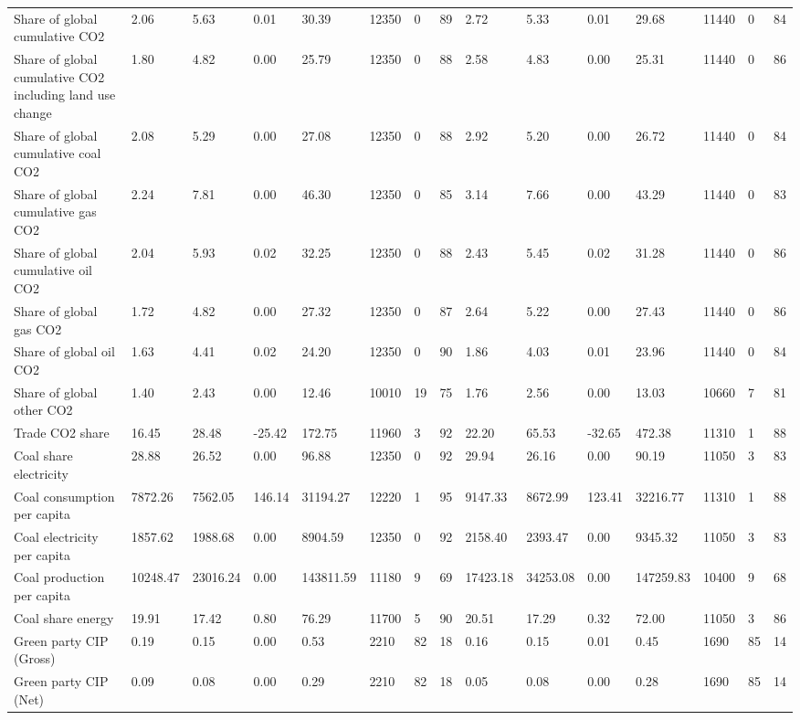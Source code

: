 \begin{longtable}{lllllllllllllll}
Share of global cumulative CO2 & 2.06 & 5.63 & 0.01 & 30.39 & 12350 & 0 & 89 & 2.72 & 5.33 & 0.01 & 29.68 & 11440 & 0 & 84\\
Share of global cumulative CO2 including land use change & 1.80 & 4.82 & 0.00 & 25.79 & 12350 & 0 & 88 & 2.58 & 4.83 & 0.00 & 25.31 & 11440 & 0 & 86\\
Share of global cumulative coal CO2 & 2.08 & 5.29 & 0.00 & 27.08 & 12350 & 0 & 88 & 2.92 & 5.20 & 0.00 & 26.72 & 11440 & 0 & 84\\
Share of global cumulative gas CO2 & 2.24 & 7.81 & 0.00 & 46.30 & 12350 & 0 & 85 & 3.14 & 7.66 & 0.00 & 43.29 & 11440 & 0 & 83\\
\addlinespace
Share of global cumulative oil CO2 & 2.04 & 5.93 & 0.02 & 32.25 & 12350 & 0 & 88 & 2.43 & 5.45 & 0.02 & 31.28 & 11440 & 0 & 86\\
Share of global gas CO2 & 1.72 & 4.82 & 0.00 & 27.32 & 12350 & 0 & 87 & 2.64 & 5.22 & 0.00 & 27.43 & 11440 & 0 & 86\\
Share of global oil CO2 & 1.63 & 4.41 & 0.02 & 24.20 & 12350 & 0 & 90 & 1.86 & 4.03 & 0.01 & 23.96 & 11440 & 0 & 84\\
Share of global other CO2 & 1.40 & 2.43 & 0.00 & 12.46 & 10010 & 19 & 75 & 1.76 & 2.56 & 0.00 & 13.03 & 10660 & 7 & 81\\
Trade CO2 share & 16.45 & 28.48 & -25.42 & 172.75 & 11960 & 3 & 92 & 22.20 & 65.53 & -32.65 & 472.38 & 11310 & 1 & 88\\
\addlinespace
Coal share electricity & 28.88 & 26.52 & 0.00 & 96.88 & 12350 & 0 & 92 & 29.94 & 26.16 & 0.00 & 90.19 & 11050 & 3 & 83\\
Coal consumption per capita & 7872.26 & 7562.05 & 146.14 & 31194.27 & 12220 & 1 & 95 & 9147.33 & 8672.99 & 123.41 & 32216.77 & 11310 & 1 & 88\\
Coal electricity per capita & 1857.62 & 1988.68 & 0.00 & 8904.59 & 12350 & 0 & 92 & 2158.40 & 2393.47 & 0.00 & 9345.32 & 11050 & 3 & 83\\
Coal production per capita & 10248.47 & 23016.24 & 0.00 & 143811.59 & 11180 & 9 & 69 & 17423.18 & 34253.08 & 0.00 & 147259.83 & 10400 & 9 & 68\\
Coal share energy & 19.91 & 17.42 & 0.80 & 76.29 & 11700 & 5 & 90 & 20.51 & 17.29 & 0.32 & 72.00 & 11050 & 3 & 86\\
\addlinespace
Green party CIP (Gross) & 0.19 & 0.15 & 0.00 & 0.53 & 2210 & 82 & 18 & 0.16 & 0.15 & 0.01 & 0.45 & 1690 & 85 & 14\\
Green party CIP (Net) & 0.09 & 0.08 & 0.00 & 0.29 & 2210 & 82 & 18 & 0.05 & 0.08 & 0.00 & 0.28 & 1690 & 85 & 14\\

\end{longtable}
